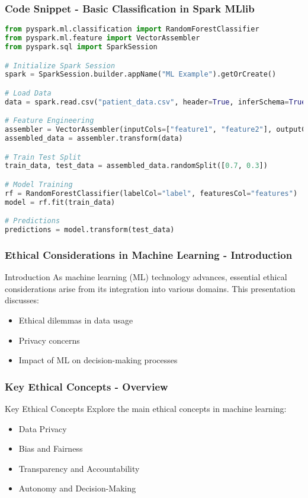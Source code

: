 \documentclass[aspectratio=169]{beamer}
\begin{document}
\begin{frame}[fragile]
    \frametitle{Code Snippet - Basic Classification in Spark MLlib}
    
    \begin{lstlisting}[language=Python]
from pyspark.ml.classification import RandomForestClassifier
from pyspark.ml.feature import VectorAssembler
from pyspark.sql import SparkSession

# Initialize Spark Session
spark = SparkSession.builder.appName("ML Example").getOrCreate()

# Load Data
data = spark.read.csv("patient_data.csv", header=True, inferSchema=True)

# Feature Engineering
assembler = VectorAssembler(inputCols=["feature1", "feature2"], outputCol="features")
assembled_data = assembler.transform(data)

# Train Test Split
train_data, test_data = assembled_data.randomSplit([0.7, 0.3])

# Model Training
rf = RandomForestClassifier(labelCol="label", featuresCol="features")
model = rf.fit(train_data)

# Predictions
predictions = model.transform(test_data)
    \end{lstlisting}
\end{frame}

\begin{frame}[fragile]
    \frametitle{Ethical Considerations in Machine Learning - Introduction}
    \begin{block}{Introduction}
        As machine learning (ML) technology advances, 
        essential ethical considerations arise from its integration into various domains. 
        This presentation discusses:
    \end{block}
    \begin{itemize}
        \item Ethical dilemmas in data usage
        \item Privacy concerns
        \item Impact of ML on decision-making processes
    \end{itemize}
\end{frame}

\begin{frame}[fragile]
    \frametitle{Key Ethical Concepts - Overview}
    \begin{block}{Key Ethical Concepts}
        Explore the main ethical concepts in machine learning:
    \end{block}
    \begin{itemize}
        \item Data Privacy
        \item Bias and Fairness
        \item Transparency and Accountability
        \item Autonomy and Decision-Making
    \end{itemize}
\end{frame}
\end{document}
